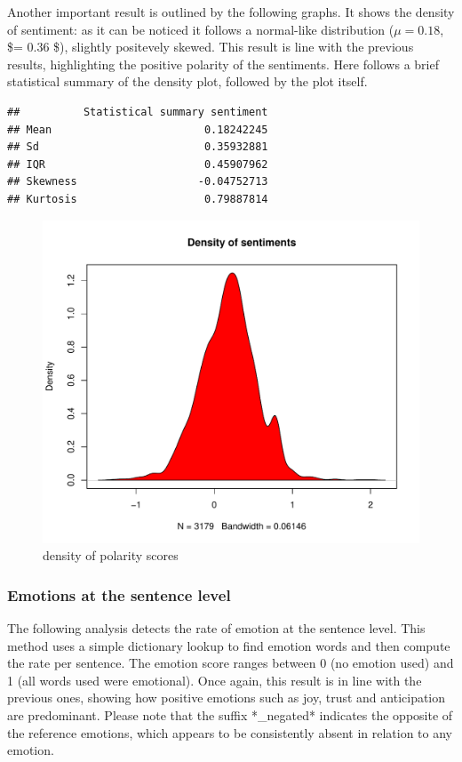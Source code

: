 \documentclass[
]{article}
\begin{document}
Another important result is outlined by the following graphs. It shows
the density of sentiment: as it can be noticed it follows a normal-like
distribution (\(\mu = 0.18\), \$\sigma = 0.36 \$), slightly positevely
skewed. This result is line with the previous results, highlighting the
positive polarity of the sentiments. Here follows a brief statistical
summary of the density plot, followed by the plot itself.

\begin{verbatim}
##          Statistical summary sentiment
## Mean                        0.18242245
## Sd                          0.35932881
## IQR                         0.45907962
## Skewness                   -0.04752713
## Kurtosis                    0.79887814
\end{verbatim}

\begin{figure}
\centering
\includegraphics{Trial1_files/figure-latex/fig7-1.pdf}
\caption{\label{fig:fig7}density of polarity scores}
\end{figure}

\hypertarget{emotions-at-the-sentence-level}{%
\subsubsection{Emotions at the sentence
level}\label{emotions-at-the-sentence-level}}

The following analysis detects the rate of emotion at the sentence
level. This method uses a simple dictionary lookup to find emotion words
and then compute the rate per sentence. The emotion score ranges between
0 (no emotion used) and 1 (all words used were emotional). Once again,
this result is in line with the previous ones, showing how positive
emotions such as joy, trust and anticipation are predominant. Please
note that the suffix *\_negated* indicates the opposite of the reference
emotions, which appears to be consistently absent in relation to any
emotion.
\end{document}
